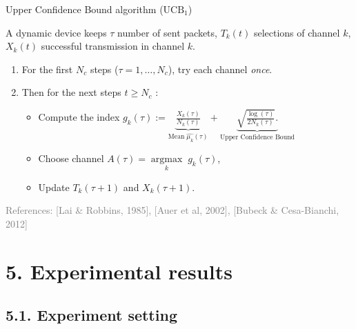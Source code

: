 \documentclass[12pt,english,ignorenonframetext,]{beamer}
\providecommand{\tightlist}{%
  \setlength{\itemsep}{0pt}\setlength{\parskip}{0pt}}
\begin{document}
\begin{frame}{Upper Confidence Bound algorithm (\(\mathrm{UCB}_1\))}

A dynamic device keeps \(\tau\) number of sent packets, \(T_k(t)\)
selections of channel \(k\), \(X_k(t)\) successful transmission in
channel \(k\).

\begin{enumerate}
\def\labelenumi{\arabic{enumi}.}
\tightlist
\item
  For the first \(N_c\) steps (\(\tau=1,\dots,N_c\)), try each channel
  \emph{once}.
\item
  Then for the next steps \(t \geq N_c\) :

  \begin{itemize}
  \tightlist
  \item
    Compute the index
    \(g_k(\tau) := \underbrace{\frac{X_k(\tau)}{N_k(\tau)}}_{\text{Mean}\; \widehat{\mu_k}(\tau)} + \underbrace{\sqrt{\frac{\log(\tau)}{2 N_k(\tau)}}.}_{\text{Upper Confidence Bound}}\)
  \item
    Choose channel
    \(A(\tau) = \mathop{\arg\max}\limits_{k} \; g_k(\tau)\),
  \item
    Update \(T_k(\tau+1)\) and \(X_k(\tau+1)\).
  \end{itemize}
\end{enumerate}

\vfill{}\hfill{}\tiny{\textcolor{gray}{References: [Lai \& Robbins, 1985], [Auer et al, 2002], [Bubeck \& Cesa-Bianchi, 2012]}}

\end{frame}



\section{\hfill{}5. Experimental results\hfill{}}

\subsection{\hfill{}5.1. Experiment setting\hfill{}}
\end{document}
